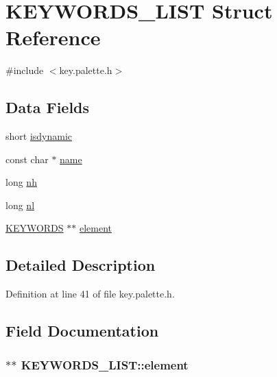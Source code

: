 \hypertarget{struct_k_e_y_w_o_r_d_s___l_i_s_t}{\section{K\-E\-Y\-W\-O\-R\-D\-S\-\_\-\-L\-I\-S\-T Struct Reference}
\label{struct_k_e_y_w_o_r_d_s___l_i_s_t}
}


{\ttfamily \#include $<$key.\-palette.\-h$>$}

\subsection*{Data Fields}
\begin{DoxyCompactItemize}
\item 
short \hyperlink{struct_k_e_y_w_o_r_d_s___l_i_s_t_ad1079e4adbde20c2dbea75b17be761ab}{isdynamic}
\item 
const char $\ast$ \hyperlink{struct_k_e_y_w_o_r_d_s___l_i_s_t_ac4d58ddf79266bc3ca07a0d8aa8b92d6}{name}
\item 
long \hyperlink{struct_k_e_y_w_o_r_d_s___l_i_s_t_a96a1aa3a1e3282a0029b55245f7bc697}{nh}
\item 
long \hyperlink{struct_k_e_y_w_o_r_d_s___l_i_s_t_a86f06811b371ffb07521e5270f359dbf}{nl}
\item 
\hyperlink{struct_k_e_y_w_o_r_d_s}{K\-E\-Y\-W\-O\-R\-D\-S} $\ast$$\ast$ \hyperlink{struct_k_e_y_w_o_r_d_s___l_i_s_t_a848ac980b902d6b317e6fb164d77c8bb}{element}
\end{DoxyCompactItemize}


\subsection{Detailed Description}


Definition at line 41 of file key.\-palette.\-h.



\subsection{Field Documentation}
\hypertarget{struct_k_e_y_w_o_r_d_s___l_i_s_t_a848ac980b902d6b317e6fb164d77c8bb}{
\subsubsection[{element}]{$\ast$$\ast$ K\-E\-Y\-W\-O\-R\-D\-S\-\_\-\-L\-I\-S\-T\-::element}}\label{struct_k_e_y_w_o_r_d_s___l_i_s_t_a848ac980b902d6b317e6fb164d77c8bb}


